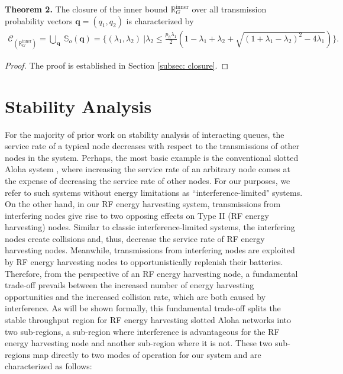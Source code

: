 \documentclass[draftcls,12pt,onecolumn]{IEEEtran}
\begin{document}
\indent \textbf{Theorem 2.} The closure of the inner bound $\mathbb{R}_G^{\text{inner}}$ over all transmission probability vectors $\boldsymbol{q}=(q_1,q_2)$ is characterized by 
 \begin{align} \label{eqn: closure}
\mathcal{C}_{(\mathbb{R}_G^{\text{inner}})}= \bigcup\limits_{\boldsymbol{q}}  \ \mathbb{S}_o(\boldsymbol{q})=\bigg\{ \! (\lambda_1, \lambda_2) \ \big |  \lambda_2 \leq \frac{p_h \lambda_1}{2} \! \left( 1 \! - \! \lambda_1 \! + \! \lambda_2 \! + \! \sqrt{(1 \! + \! \lambda_1 \! - \! \lambda_2)^2 \! - \! 4 \lambda_1}\right) \! \! \bigg\}.
\end{align}
\begin{proof}
The proof is established in Section \ref{subsec: closure}.
\end{proof}

\section{Stability Analysis} \label{sec:Stability_Analysis}
For the majority of prior work on stability analysis of interacting queues, the service rate of a typical node decreases with respect to the transmissions of other nodes in the system. Perhaps, the most basic example is the conventional slotted Aloha system \cite{rao1988stability}, where increasing the service rate of an arbitrary node comes at the expense of decreasing the service rate of other nodes. For our purposes, we refer to such systems without energy limitations as ``interference-limited" systems.\\ 
\indent On the other hand, in our RF energy harvesting system, transmissions from interfering nodes give rise to two opposing effects on Type II (RF energy harvesting) nodes. Similar to classic interference-limited systems, the interfering nodes create collisions and, thus, decrease the service rate of RF energy harvesting nodes. Meanwhile, transmissions from interfering nodes are exploited by RF energy harvesting nodes to opportunistically replenish their batteries. Therefore, from the perspective of an RF energy harvesting node, a fundamental trade-off prevails between the increased number of energy harvesting opportunities and the increased collision rate, which are both caused by interference. As will be shown formally, this fundamental trade-off splits the stable throughput region for RF energy harvesting slotted Aloha networks into two sub-regions, a sub-region where interference is advantageous for the RF energy harvesting node and another sub-region where it is not. These two sub-regions map directly to two modes of operation for our system and are characterized as follows:
\end{document}
